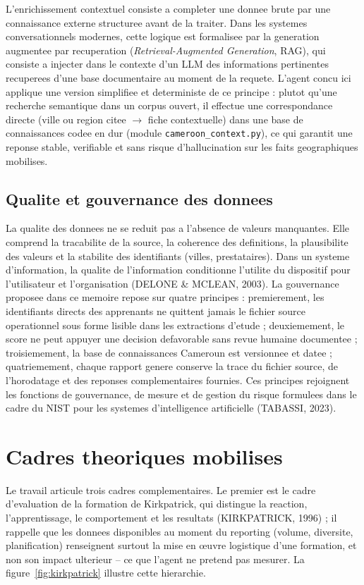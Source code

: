 \documentclass[12pt,a4paper,twoside,openany]{report}
\begin{document}
L'enrichissement contextuel consiste a completer une donnee brute par une connaissance externe structuree avant de la traiter. Dans les systemes conversationnels modernes, cette logique est formalisee par la generation augmentee par recuperation (\textit{Retrieval-Augmented Generation}, RAG), qui consiste a injecter dans le contexte d'un LLM des informations pertinentes recuperees d'une base documentaire au moment de la requete. L'agent concu ici applique une version simplifiee et deterministe de ce principe : plutot qu'une recherche semantique dans un corpus ouvert, il effectue une correspondance directe (ville ou region citee \(\rightarrow\) fiche contextuelle) dans une base de connaissances codee en dur (module \texttt{cameroon\_context.py}), ce qui garantit une reponse stable, verifiable et sans risque d'hallucination sur les faits geographiques mobilises.

\subsection{Qualite et gouvernance des donnees}

La qualite des donnees ne se reduit pas a l'absence de valeurs manquantes. Elle comprend la tracabilite de la source, la coherence des definitions, la plausibilite des valeurs et la stabilite des identifiants (villes, prestataires). Dans un systeme d'information, la qualite de l'information conditionne l'utilite du dispositif pour l'utilisateur et l'organisation (DELONE \& MCLEAN, 2003). La gouvernance proposee dans ce memoire repose sur quatre principes : premierement, les identifiants directs des apprenants ne quittent jamais le fichier source operationnel sous forme lisible dans les extractions d'etude ; deuxiemement, le score ne peut appuyer une decision defavorable sans revue humaine documentee ; troisiemement, la base de connaissances Cameroun est versionnee et datee ; quatriemement, chaque rapport genere conserve la trace du fichier source, de l'horodatage et des reponses complementaires fournies. Ces principes rejoignent les fonctions de gouvernance, de mesure et de gestion du risque formulees dans le cadre du NIST pour les systemes d'intelligence artificielle (TABASSI, 2023).

\section{Cadres theoriques mobilises}

Le travail articule trois cadres complementaires. Le premier est le cadre d'evaluation de la formation de Kirkpatrick, qui distingue la reaction, l'apprentissage, le comportement et les resultats (KIRKPATRICK, 1996) ; il rappelle que les donnees disponibles au moment du reporting (volume, diversite, planification) renseignent surtout la mise en \oe uvre logistique d'une formation, et non son impact ulterieur -- ce que l'agent ne pretend pas mesurer. La figure~\ref{fig:kirkpatrick} illustre cette hierarchie.
\end{document}
